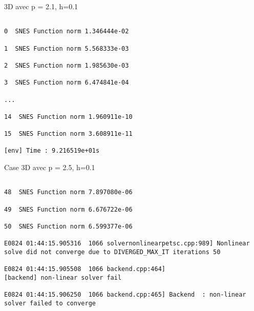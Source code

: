 \documentclass[11pt]{beamer}
\begin{document}
\begin{frame}{3D avec p = 2.1, h=0.1}

\begin{verbatim}

0  SNES Function norm 1.346444e-02

1  SNES Function norm 5.568333e-03

2  SNES Function norm 1.985630e-03

3  SNES Function norm 6.474841e-04

...

14  SNES Function norm 1.960911e-10

15  SNES Function norm 3.608911e-11

[env] Time : 9.216519e+01s

\end{verbatim}
\end{frame}






\begin{frame}{Case 3D avec p = 2.5, h=0.1}
\begin{verbatim}

48  SNES Function norm 7.897080e-06

49  SNES Function norm 6.676722e-06

50  SNES Function norm 6.599377e-06

E0824 01:44:15.905316  1066 solvernonlinearpetsc.cpp:989] Nonlinear solve did not converge due to DIVERGED_MAX_IT iterations 50

E0824 01:44:15.905508  1066 backend.cpp:464]
[backend] non-linear solver fail

E0824 01:44:15.906250  1066 backend.cpp:465] Backend  : non-linear solver failed to converge

\end{verbatim}
\end{frame}
\end{document}
